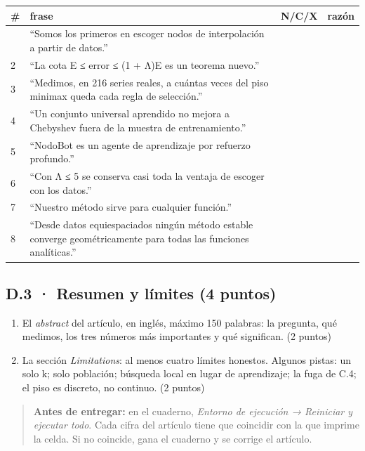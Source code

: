 \begin{longtable}[]{@{}p{0.5cm}p{9.4cm}p{0.9cm}p{4.2cm}@{}}
\toprule
\# & frase & N/C/X & razón \\
\midrule
\endhead
\bottomrule
\endlastfoot
1 & ``Somos los primeros en escoger nodos de interpolación a partir de datos.'' & & \\
2 & ``La cota E ≤ error ≤ (1 + Λ)E es un teorema nuevo.'' & & \\
3 & ``Medimos, en 216 series reales, a cuántas veces del piso minimax queda cada regla de selección.'' & & \\
4 & ``Un conjunto universal aprendido no mejora a Chebyshev fuera de la muestra de entrenamiento.'' & & \\
5 & ``NodoBot es un agente de aprendizaje por refuerzo profundo.'' & & \\
6 & ``Con Λ ≤ 5 se conserva casi toda la ventaja de escoger con los datos.'' & & \\
7 & ``Nuestro método sirve para cualquier función.'' & & \\
8 & ``Desde datos equiespaciados ningún método estable converge geométricamente para todas las funciones analíticas.'' & & \\
\end{longtable}

\subsection{D.3 · Resumen y límites (4 puntos)}

\begin{enumerate}
\def\labelenumi{(\alph{enumi})}
\item El \emph{abstract} del artículo, en inglés, máximo 150 palabras: la pregunta, qué medimos, los tres números más importantes y qué significan. (2 puntos)
\item La sección \emph{Limitations}: al menos cuatro límites honestos. Algunos pistas: un solo k; solo población; búsqueda local en lugar de aprendizaje; la fuga de C.4; el piso es discreto, no continuo. (2 puntos)
\end{enumerate}

\begin{quote}
\textbf{Antes de entregar:} en el cuaderno, \emph{Entorno de ejecución → Reiniciar y ejecutar todo}. Cada cifra del artículo tiene que coincidir con la que imprime la celda. Si no coincide, gana el cuaderno y se corrige el artículo.
\end{quote}

